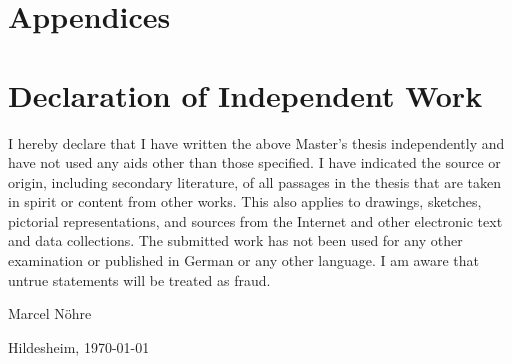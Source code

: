 \documentclass[11pt,        %
  ngerman,english,          %
  paper=a4,                 %
  captions=tablesignature,  %
  listof=numbered,          %
  bibliography=totoc,       %
  headings=small,           %
  headinclude=false,        %
  footinclude=false,        %
  parskip=half-,            %
  oneside,                  %
  BCOR=15mm,                %
  DIV=12                    %
  ]{scrbook}                %
\begin{document}
\chapter{Appendices}\label{chapter:appendix}
\chapter*{Declaration of Independent Work}
\thispagestyle{empty}
  {
    I hereby declare that I have written the above Master's thesis independently
    and have not used any aids other than those specified. I have indicated the 
    source or origin, including secondary literature, of all passages in the thesis 
    that are taken in spirit or content from other works. This also applies to 
    drawings, sketches, pictorial representations, and sources from the Internet 
    and other electronic text and data collections. The submitted work has not 
    been used for any other examination or published in German or any other 
    language. I am aware that untrue statements will be treated as fraud.
  }


\vspace*{4cm}

Marcel Nöhre

\vspace*{1cm}

Hildesheim, \today
\end{document}
